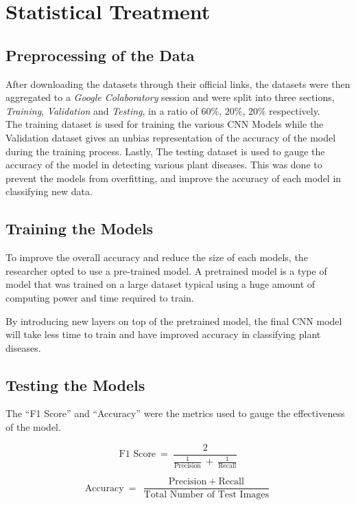 \section{Statistical Treatment}

\subsection{Preprocessing of the Data}
After downloading the datasets through their official links, 
the datasets were then aggregated to a \emph{Google Colaboratory} 
session and were split into three sections, \emph{Training}, \emph{Validation} and 
\emph{Testing}, in a ratio of $ 60\% $, $ 20\% $, $ 20\% $ respectively. \\

The training dataset is used for training the various CNN Models while the Validation dataset 
gives an unbias representation of the accuracy of the model during the training process. Lastly, 
The testing dataset is used to gauge the accuracy of the model in detecting various plant diseases.
This was done to prevent the models from overfitting, and improve 
the accuracy of each model in classifying new data. 

\subsection{Training the Models}
To improve the overall accuracy and reduce the size 
of each models, the researcher opted to use a pre-trained model. 
A pretrained model is a type of model that was trained on a large 
dataset typical using a huge amount of computing power and time 
required to train. 

By introducing new layers on top of the pretrained model, the final 
CNN model will take less time to train and have improved accuracy in
classifying plant diseases.


\subsection{Testing the Models}
The ``F1 Score'' and ``Accuracy'' were the metrics
used to gauge the effectiveness of the model. 

\[ 
 \text{F1 Score} \: = \: \frac{2}{\frac{1}{\text{Precision}} \: + \: 
\frac{1}{\text{Recall}}} 
\]

\[
      \text{Accuracy} \: = \: \frac{\text{Precision} \: + \: 
      \text{Recall}}{\text{Total Number of Test Images}}
\]

